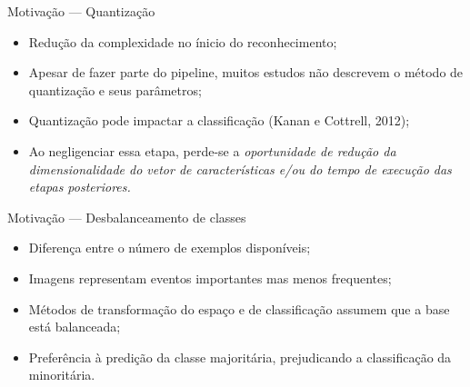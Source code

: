 \documentclass{beamer}
\begin{document}
\begin{frame}{Motivação --- Quantização}
  \setlength\leftmargini{1em}
  \justifying
  \begin{itemize}
    \justifying
    \item Redução da complexidade no ínicio do reconhecimento;
    \item Apesar de fazer parte do pipeline, muitos estudos não descrevem o método de quantização e seus parâmetros;
    \item Quantização pode impactar a classificação (Kanan e Cottrell, 2012);
    \item Ao negligenciar essa etapa, perde-se a \textit{oportunidade de redução da dimensionalidade do vetor de características e/ou do tempo de execução das etapas posteriores.}
  \end{itemize}
\end{frame}
\begin{frame}{Motivação --- Desbalanceamento de classes}
  \setlength\leftmargini{1em}
  \justifying
  \begin{itemize}
    \item Diferença entre o número de exemplos disponíveis;
    \item Imagens representam eventos importantes mas menos frequentes;
    \item Métodos de transformação do espaço e de
    classificação assumem que a base está balanceada;
    \item Preferência à predição da classe majoritária, prejudicando a classificação da minoritária.
  \end{itemize}
\end{frame}
\end{document}
